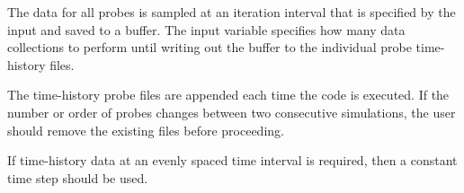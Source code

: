 
The data for all probes is sampled at an iteration interval that is specified by
the input
 and
saved to a buffer.
%
The input variable 
specifies how many data collections to perform until writing out the buffer to
the individual probe time-history files.


The time-history probe files are appended each time the code is executed.
%
If the number or order of probes changes between two consecutive simulations,
the user should remove the existing files before proceeding.


If time-history data at an evenly spaced time interval is required, then a
constant time step should be used.



